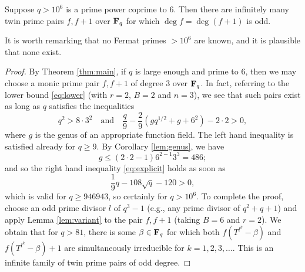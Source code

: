 \documentclass[a4paper]{compositio}
\begin{document}
\begin{lem}\label{lem:hall} Suppose $q > 10^6$ is a prime power
coprime to $6$. Then there are infinitely many twin prime pairs
$f,f+1$ over $\mathbf{F}_q$ for which $\deg{f} = \deg{(f+1)}$ is odd.
\end{lem}

It is worth remarking that no Fermat primes $> 10^6$ are known, and
it is plausible that none exist.

\begin{proof} By Theorem
\ref{thm:main}, if $q$ is large enough and prime to $6$, then we may
choose a monic prime pair $f, f+1$ of degree $3$ over $\mathbf{F}_q$. In
fact, referring to the lower bound \eqref{eq:lower} (with $r=2$,
$B=2$ and $n=3$), we see that such pairs exist as long as $q$
satisfies the inequalities
\begin{equation}\label{eq:explicit}
 q^2 > 8\cdot 3^2 \quad \text{and}\quad \frac{q}{9} - \frac{2}{9}(g q^{1/2} + g + 6^2) - 2\cdot 2 >
 0,
\end{equation}
where $g$ is the genus of an appropriate function field. The left
hand inequality is satisfied already for $q \geq 9$. By Corollary
\ref{lem:genus}, we have
\[ g \leq (2\cdot 2-1) 6^{2-1} 3^3 = 486; \]
and so the right hand inequality \eqref{eq:explicit} holds as soon
as
\[ \frac{1}{9} q - 108\sqrt{q} - 120 > 0, \]
which is valid for $q \geq 946943$, so certainly for $q > 10^6$. To
complete the proof, choose an odd prime divisor $l$ of $q^3-1$
(e.g., any prime divisor of $q^2+q+1$) and apply Lemma
\ref{lem:variant} to the pair $f, f+1$ (taking $B=6$ and $r=2$). We
obtain that for $q> 81$, there is some $\beta \in \mathbf{F}_q$ for which
both $f(T^{l^k}-\beta)$ and $f(T^{l^k}-\beta)+1$ are simultaneously
irreducible for $k = 1, 2, 3, \dots$. This is an infinite family of
twin prime pairs of odd degree.
\end{proof}
\end{document}
